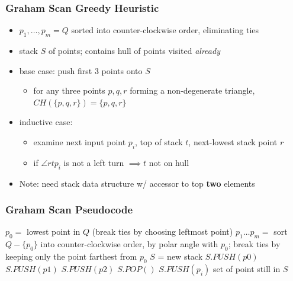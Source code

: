 \documentclass{beamer}
\begin{document}
\begin{frame} \frametitle{Graham Scan Greedy Heuristic}
\begin{itemize}
  \item $p_1, \ldots, p_m = Q$ sorted into counter-clockwise order, eliminating ties
  \item stack $S$ of points; contains hull of points visited \emph{already}
  \item base case: push first 3 points onto $S$
  \begin{itemize}
    \item for any three points $p, q, r$ forming a non-degenerate triangle,
      $CH(\{p, q, r\}) = \{p, q, r\}$
    \end{itemize}
  \item inductive case:
    \begin{itemize}
      \item examine next input point $p_i$, top of stack $t$, next-lowest stack point $r$
      \item if $\angle r t p_i$ is not a left turn $\implies t$ not on hull
    \end{itemize}
  \item Note: need stack data structure w/ accessor to top \textbf{two} elements
  \end{itemize}
\end{frame}

\begin{frame} \frametitle{Graham Scan Pseudocode}
  {\small
\begin{algorithmic}[1]
   
    \State $p_0 = $ lowest point in $Q$ (break ties by choosing leftmost point)
    \State $p_1 \ldots p_m = $ sort $Q-\{p_0\}$ into counter-clockwise order,
      by polar angle with $p_0$; break ties by keeping only the point farthest from $p_0$
    \State $S$ = new stack
    \State $S.PUSH(p0)$
    \State $S.PUSH(p1)$
    \State $S.PUSH(p2)$
        \State $S.POP()$
      \EndWhile
      \State $S.PUSH(p_i)$
    \EndFor
    \State \Return set of point still in $S$
  \EndFunction
\end{algorithmic}
}
\end{frame}
\end{document}
